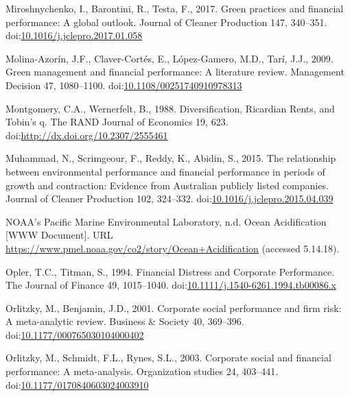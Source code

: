 \documentclass[12pt,]{article}
\begin{document}
\hypertarget{ref-MiroshnychenkoGreenpracticesfinancial2017}{}
Miroshnychenko, I., Barontini, R., Testa, F., 2017. Green practices and
financial performance: A global outlook. Journal of Cleaner Production
147, 340--351.
doi:\href{https://doi.org/10.1016/j.jclepro.2017.01.058}{10.1016/j.jclepro.2017.01.058}

\hypertarget{ref-Molina-Azorin2009}{}
Molina-Azorín, J.F., Claver-Cortés, E., López-Gamero, M.D., Tarí, J.J.,
2009. Green management and financial performance: A literature review.
Management Decision 47, 1080--1100.
doi:\href{https://doi.org/10.1108/00251740910978313}{10.1108/00251740910978313}

\hypertarget{ref-Montgomery1988}{}
Montgomery, C.A., Wernerfelt, B., 1988. Diversification, Ricardian
Rents, and Tobin's q. The RAND Journal of Economics 19, 623.
doi:\href{https://doi.org/http://dx.doi.org/10.2307/2555461}{http://dx.doi.org/10.2307/2555461}

\hypertarget{ref-Muhammadrelationshipenvironmentalperformance2015}{}
Muhammad, N., Scrimgeour, F., Reddy, K., Abidin, S., 2015. The
relationship between environmental performance and financial performance
in periods of growth and contraction: Evidence from Australian publicly
listed companies. Journal of Cleaner Production 102, 324--332.
doi:\href{https://doi.org/10.1016/j.jclepro.2015.04.039}{10.1016/j.jclepro.2015.04.039}

\hypertarget{ref-NOAAsPacificMarineEnvironmentalLaboratory}{}
NOAA's Pacific Marine Environmental Laboratory, n.d. Ocean Acidification
{[}WWW Document{]}. URL
\url{https://www.pmel.noaa.gov/co2/story/Ocean+Acidification} (accessed
5.14.18).

\hypertarget{ref-Opler1994}{}
Opler, T.C., Titman, S., 1994. Financial Distress and Corporate
Performance. The Journal of Finance 49, 1015--1040.
doi:\href{https://doi.org/10.1111/j.1540-6261.1994.tb00086.x}{10.1111/j.1540-6261.1994.tb00086.x}

\hypertarget{ref-Orlitzky2001}{}
Orlitzky, M., Benjamin, J.D., 2001. Corporate social performance and
firm risk: A meta-analytic review. Business \& Society 40, 369--396.
doi:\href{https://doi.org/10.1177/000765030104000402}{10.1177/000765030104000402}

\hypertarget{ref-Orlitzky2003}{}
Orlitzky, M., Schmidt, F.L., Rynes, S.L., 2003. Corporate social and
financial performance: A meta-analysis. Organization studies 24,
403--441.
doi:\href{https://doi.org/10.1177/0170840603024003910}{10.1177/0170840603024003910}
\end{document}
